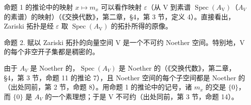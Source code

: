命题 1 的推论中的映射 \(x \mapsto m_{x}\) 可以看作映射 \(\varepsilon\)（从 V 到素谱 \(\operatorname{Spec}(A_{\mathrm{V}})\)（\(A_{V}\) 的素谱）的映射）（《交换代数》，第二章，§4，第 3 节，定义 4）。直接看出，Zariski 拓扑是经 \(\varepsilon\) 取 \(\operatorname{Spec}(A_{\mathrm{V}})\) 的拓扑所得的原像。

命题 2. 赋以 Zariski 拓扑的向量空间 V 是一个不可约 Noether 空间。特别地，V 的每个非空开子集都是稠密的。

由于 \(A_{V}\) 是 Noether 的，\(\operatorname{Spec}(A_{V})\) 是 Noether 的（《交换代数》，第二章，§4，第 3 节，命题 11 的推论 7），且 Noether 空间的每个子空间都是 Noether 的（出处同前，第 2 节，命题 8）。用命题 1 的推论中的记号，诸 \(m_{x}\) 的交是 \(\{0\}\)，而 \(\{0\}\) 是 \(A_{V}\) 的一个素理想；于是 V 不可约（出处同前，第 3 节，命题 14）。

